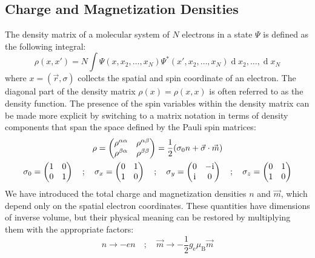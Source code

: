 \documentclass[12pt]{article}
\newcommand{\dd}{\operatorname{d}}
\newcommand{\iu}{\ensuremath\mathrm{i}}
\begin{document}
\subsection{Charge and Magnetization Densities}
The density matrix of a molecular system of $N$ electrons in a state $\Psi$ is defined as the following integral:
\begin{equation}
 \rho(x,x') = N\int\Psi(x,x_2,\dots,x_N)\Psi^*(x',x_2,\dots,x_N)\dd x_2,\dots,\dd x_N
\end{equation}
where $x=(\vec{r},\sigma)$ collects the spatial and spin coordinate of an electron.
The diagonal part of the density matrix $\rho(x)=\rho(x,x)$ is often referred to as the density function.
The presence of the spin variables within the density matrix can be made more explicit by switching to a matrix notation in terms of density components that span the space defined by the Pauli spin matrices:
\begin{gather}
 \rho = \begin{pmatrix} \rho^{\alpha\alpha} & \rho^{\alpha\beta} \\ \rho^{\beta\alpha} & \rho^{\beta\beta} \end{pmatrix} =
  \frac{1}{2}(\sigma_0n+\vec{\sigma}\cdot\vec{m}) \\
 \sigma_0 = \begin{pmatrix} 1 & 0    \\   0 & 1 \end{pmatrix} \quad;\quad
 \sigma_x = \begin{pmatrix} 0 & 1    \\   1 & 0 \end{pmatrix} \quad;\quad
 \sigma_y = \begin{pmatrix} 0 & -\iu \\ \iu & 0 \end{pmatrix} \quad;\quad
 \sigma_z = \begin{pmatrix} 0 & 1    \\   1 & 0 \end{pmatrix}
\end{gather}
We have introduced the total charge and magnetization densities $n$ and $\vec{m}$, which depend only on the spatial electron coordinates.
These quantities have dimensions of inverse volume, but their physical meaning can be restored by multiplying them with the appropriate factors:
\begin{equation}
 n\rightarrow -en \quad;\quad \vec{m}\rightarrow-\frac{1}{2}g_\mathrm{e}\mu_\mathrm{B}\vec{m}
\end{equation}
\end{document}
